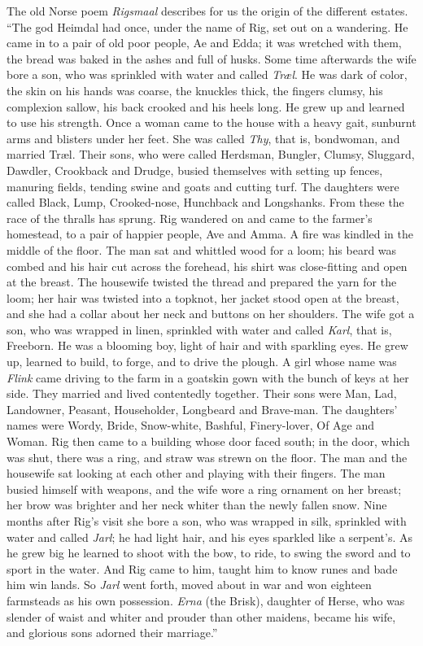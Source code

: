 \documentclass[12pt,a4paper,openany]{book}
\newcommand{\opage}[1]{\marginnote{\footnotesize\textit{[#1]}}}
\begin{document}
The old Norse poem \emph{Rigsmaal} describes for us
the origin of the different estates. ``The god Heimdal
had once, under the name of Rig, set out on a wandering.
He came in to a pair of old poor people,
\setcounter{footnote}{0}%
\opage{144}Ae and Edda; it was wretched with them, the bread was baked
in the ashes and full of husks. Some time afterwards the
wife bore a son, who was sprinkled with water and called
\emph{Træl}. He was dark of color, the skin on his
hands was coarse, the knuckles thick, the fingers clumsy,
his complexion sallow, his back crooked and his heels
long. He grew up and learned to use his strength.
Once a woman came to the house with a heavy gait,
sunburnt arms and blisters under her feet. She was called
\emph{Thy}, that is, bondwoman, and married Træl. Their
sons, who were called Herdsman, Bungler, Clumsy, Sluggard,
Dawdler, Crookback and Drudge, busied themselves with
setting up fences, manuring fields, tending swine and goats and
cutting turf. The daughters were called Black, Lump, Crooked-nose,
Hunchback and Longshanks. From these the race of the thralls has sprung.
Rig wandered on and came to the farmer's
homestead, to a pair of happier people, Ave and Amma. A
fire was kindled in the middle of the floor. The man sat and
whittled wood for a loom; his beard was combed and
his hair cut across the forehead, his shirt was close-fitting and open
at the breast. The housewife twisted the thread and prepared the
yarn for the loom; her hair was twisted into a topknot,
her jacket stood open at the breast, and she had a collar %
about her neck and buttons on her shoulders. The wife got a
son, who was wrapped in linen, sprinkled with water and
called \emph{Karl}, that is, Freeborn. He was a blooming
boy, light of hair and with sparkling eyes. He grew
up, learned to build, to forge, and to drive the plough. A girl
whose name was \emph{Flink} came driving to the farm in a goatskin
gown with the bunch of keys at her side. They married
and lived contentedly together. Their sons were
Man, Lad, Landowner, Peasant, Householder, Longbeard
\setcounter{footnote}{0}%
\opage{145}and Brave-man. The daughters' names were Wordy, Bride,
Snow-white, Bashful, Finery-lover, Of Age and Woman.
Rig then came to a building whose door faced
south; in the door, which was shut, there was a ring, and straw
was strewn on the floor. The man and the housewife sat
looking at each other and playing with their fingers. The man
busied himself with weapons, and the wife wore a ring ornament
on her breast; her brow was brighter and her neck
whiter than the newly fallen snow. Nine months after
Rig's visit she bore a son, who was wrapped in silk,
sprinkled with water and called \emph{Jarl}; he had light hair,
and his eyes sparkled like a serpent's. As he
grew big he learned to shoot with the bow,
to ride, to swing the sword and to sport in the water. And Rig
came to him, taught him to know runes and bade him
win lands. So \emph{Jarl} went forth, moved about in war
and won eighteen farmsteads as his own possession. \emph{Erna} (the Brisk),
daughter of Herse, who was slender of waist and whiter and
prouder than other maidens, became his wife, and glorious
sons adorned their marriage.''
\end{document}
